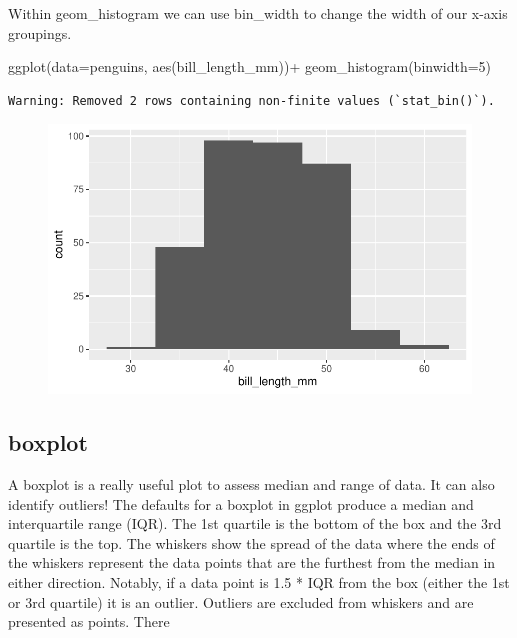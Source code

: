 \documentclass[
  letterpaper,
  DIV=11,
  numbers=noendperiod]{scrartcl}
\newenvironment{Shaded}{\begin{snugshade}}{\end{snugshade}}
\newcommand{\AttributeTok}[1]{\textcolor[rgb]{0.40,0.45,0.13}{#1}}
\newcommand{\DecValTok}[1]{\textcolor[rgb]{0.68,0.00,0.00}{#1}}
\newcommand{\FunctionTok}[1]{\textcolor[rgb]{0.28,0.35,0.67}{#1}}
\newcommand{\NormalTok}[1]{\textcolor[rgb]{0.00,0.23,0.31}{#1}}
\newcommand{\SpecialCharTok}[1]{\textcolor[rgb]{0.37,0.37,0.37}{#1}}
\begin{document}
Within geom\_histogram we can use bin\_width to change the width of our
x-axis groupings.

\begin{Shaded}
\begin{Highlighting}[]
\FunctionTok{ggplot}\NormalTok{(}\AttributeTok{data=}\NormalTok{penguins, }\FunctionTok{aes}\NormalTok{(bill\_length\_mm))}\SpecialCharTok{+}
  \FunctionTok{geom\_histogram}\NormalTok{(}\AttributeTok{binwidth=}\DecValTok{5}\NormalTok{)}
\end{Highlighting}
\end{Shaded}

\begin{verbatim}
Warning: Removed 2 rows containing non-finite values (`stat_bin()`).
\end{verbatim}

\begin{figure}[H]

{\centering \includegraphics{basic_graphs_files/figure-pdf/unnamed-chunk-7-1.pdf}

}

\end{figure}

\subsection{\texorpdfstring{\textbf{boxplot}}{boxplot}}

A boxplot is a really useful plot to assess median and range of data. It
can also identify outliers! The defaults for a boxplot in ggplot produce
a median and interquartile range (IQR). The 1st quartile is the bottom
of the box and the 3rd quartile is the top. The whiskers show the spread
of the data where the ends of the whiskers represent the data points
that are the furthest from the median in either direction. Notably, if a
data point is 1.5 * IQR from the box (either the 1st or 3rd quartile) it
is an outlier. Outliers are excluded from whiskers and are presented as
points. There
\end{document}
